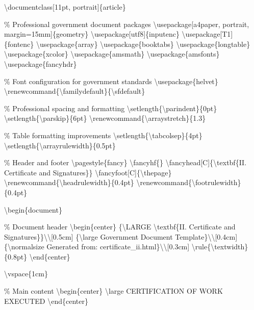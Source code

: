 \textbackslash{}documentclass[11pt, portrait]\{article\}

\% Professional government document packages
\textbackslash{}usepackage[a4paper, portrait, margin=15mm]\{geometry\}
\textbackslash{}usepackage[utf8]\{inputenc\}
\textbackslash{}usepackage[T1]\{fontenc\}
\textbackslash{}usepackage\{array\}
\textbackslash{}usepackage\{booktabs\}
\textbackslash{}usepackage\{longtable\}
\textbackslash{}usepackage\{xcolor\}
\textbackslash{}usepackage\{amsmath\}
\textbackslash{}usepackage\{amsfonts\}
\textbackslash{}usepackage\{fancyhdr\}

\% Font configuration for government standards
\textbackslash{}usepackage\{helvet\}
\textbackslash{}renewcommand\{\textbackslash{}familydefault\}\{\textbackslash{}sfdefault\}

\% Professional spacing and formatting
\textbackslash{}setlength\{\textbackslash{}parindent\}\{0pt\}
\textbackslash{}setlength\{\textbackslash{}parskip\}\{6pt\}
\textbackslash{}renewcommand\{\textbackslash{}arraystretch\}\{1.3\}

\% Table formatting improvements
\textbackslash{}setlength\{\textbackslash{}tabcolsep\}\{4pt\}
\textbackslash{}setlength\{\textbackslash{}arrayrulewidth\}\{0.5pt\}

\% Header and footer
\textbackslash{}pagestyle\{fancy\}
\textbackslash{}fancyhf\{\}
\textbackslash{}fancyhead[C]\{\textbackslash{}textbf\{II. Certificate and Signatures\}\}
\textbackslash{}fancyfoot[C]\{\textbackslash{}thepage\}
\textbackslash{}renewcommand\{\textbackslash{}headrulewidth\}\{0.4pt\}
\textbackslash{}renewcommand\{\textbackslash{}footrulewidth\}\{0.4pt\}

\textbackslash{}begin\{document\}

\% Document header
\textbackslash{}begin\{center\}
\{\textbackslash{}LARGE \textbackslash{}textbf\{II. Certificate and Signatures\}\}\textbackslash{}\textbackslash{}[0.5cm]
\{\textbackslash{}large Government Document Template\}\textbackslash{}\textbackslash{}[0.4cm]
\{\textbackslash{}normalsize Generated from: certificate\_ii.html\}\textbackslash{}\textbackslash{}[0.3cm]
\textbackslash{}rule\{\textbackslash{}textwidth\}\{0.8pt\}
\textbackslash{}end\{center\}

\textbackslash{}vspace\{1cm\}

\% Main content
\textbackslash{}begin\{center\}
\textbackslash{}large CERTIFICATION OF WORK EXECUTED
\textbackslash{}end\{center\}

